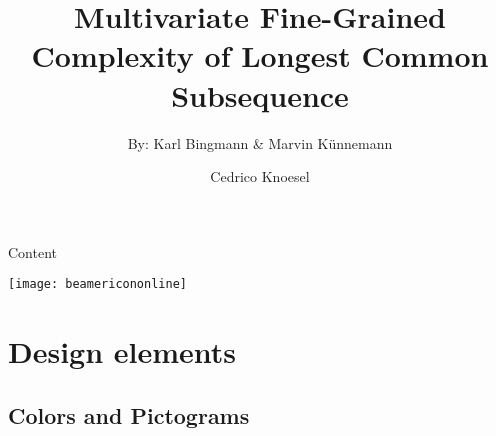 \documentclass[
 UKenglish%
 ]{beamer}%
\author[C.\, Knoesel]{Cedrico Knoesel}
\title[Multivariate Fine-Grained Complexity of LCS]{Multivariate Fine-Grained Complexity of Longest Common Subsequence}
\subtitle{By: Karl Bingmann \& Marvin Künnemann}
\institute[]{}
\begin{document}



\frame[KITgreenhalf]{\titlepage}



\begin{frame}[KITgreenTOC,t]{\fontsize{10}{10}\selectfont\textcolor{KITwhite}{Content}\hfill{}\hbox{\scalebox{0.72}{\KITlogo}}\kern3mm}
  \vspace*{-5mm}%
  \tableofcontents
\end{frame}
















{
 {\texttt{[image: beamericononline]}}%
 \frame[empty]{}}

\section{Design elements}
\subsection{Colors and Pictograms}
\end{document}
